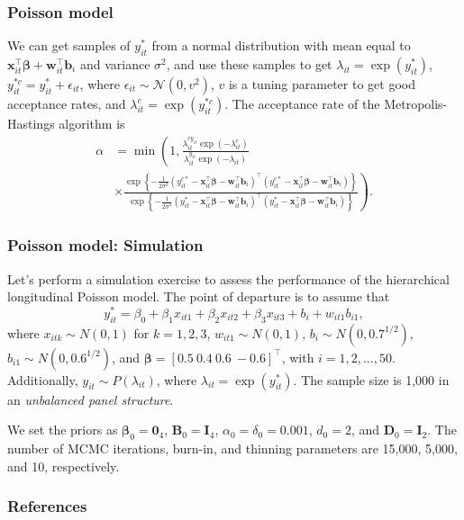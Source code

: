 \documentclass[12pt, compress]{beamer}
\begin{document}
\begin{frame}
\frametitle{Poisson model}
We can get samples of $y_{it}^*$ from a normal distribution with mean equal to $\bm{x}_{it}^{\top}\bm{\beta}+\bm{w}_{it}^{\top}\bm{b}_i$ and variance $\sigma^2$, and use these samples to get $\lambda_{it}=\exp(y_{it}^*)$, $y_{it}^{*c}=y_{it}^{*}+\epsilon_{it}$, where $\epsilon_{it}\sim\mathcal{N}(0,v^2)$, $v$ is a tuning parameter to get good acceptance rates, and $\lambda_{it}^c=\exp(y_{it}^{*c})$. The acceptance rate of the Metropolis-Hastings algorithm is 
	\begin{align*}
		\alpha&=\min\left(1,\frac{ \lambda_{it}^{cy_{it}}\exp(-\lambda_{it}^c)}{\lambda_{it}^{y_{it}}\exp(-\lambda_{it})}\right.\\
		&\times \left. \frac{\exp\left\{-\frac{1}{2\sigma^2}(y_{it}^{c*}-\bm{x}_{it}^{\top}\bm{\beta}-\bm{w}_{it}^{\top}\bm{b}_i)^{\top}(y_{it}^{c*}-\bm{x}_{it}^{\top}\bm{\beta}-\bm{w}_{it}^{\top}\bm{b}_i)\right\}}{\exp\left\{-\frac{1}{2\sigma^2}(y_{it}^{*}-\bm{x}_{it}^{\top}\bm{\beta}-\bm{w}_{it}^{\top}\bm{b}_i)^{\top}(y_{it}^{*}-\bm{x}_{it}^{\top}\bm{\beta}-\bm{w}_{it}^{\top}\bm{b}_i)\right\}}\right).
	\end{align*}

\end{frame}

\begin{frame}
\frametitle{Poisson model: Simulation}
Let's perform a simulation exercise to assess the performance of the hierarchical longitudinal Poisson model. The point of departure is to assume that 
\[
y_{it}^* = \beta_0 + \beta_1 x_{it1} + \beta_2 x_{it2} + \beta_3 x_{it3} + b_i + w_{it1} b_{i1},
\]
where $x_{itk} \sim N(0,1)$ for $k = 1, 2, 3$, $w_{it1} \sim N(0,1)$, $b_i \sim N(0, 0.7^{1/2})$, $b_{i1} \sim N(0, 0.6^{1/2})$, and $\bm{\beta} = [0.5 \ 0.4 \ 0.6 \ -0.6]^{\top}$, with $i = 1, 2, \dots, 50$. Additionally, $y_{it} \sim P(\lambda_{it})$, where $\lambda_{it} = \exp(y_{it}^*)$. The sample size is 1,000 in an \textit{unbalanced panel structure}.

We set the priors as $\bm{\beta}_0 = \bm{0}_4$, $\bm{B}_0 = \bm{I}_4$, $\alpha_0 = \delta_0 = 0.001$, $d_0 = 2$, and $\bm{D}_0 = \bm{I}_2$. The number of MCMC iterations, burn-in, and thinning parameters are 15,000, 5,000, and 10, respectively.
\end{frame}

\begin{frame}[allowframebreaks]
	\frametitle{References}
		{\footnotesize
		
		}
\end{frame}
\end{document}
